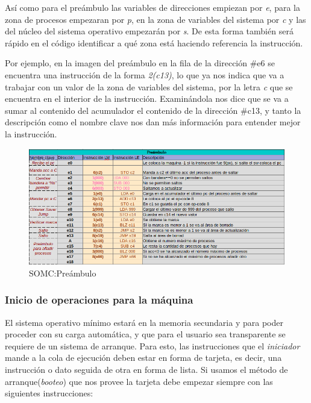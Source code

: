 \documentclass[letterpaper,12pt,oneside]{book}
\begin{document}
		Así como para el preámbulo las variables de direcciones empiezan por \textit{e}, para la zona de procesos empezaran por \textit{p},
		en la zona de variables del sistema por \textit{c} y las del núcleo del sistema operativo empezarán por \textit{s}. De esta forma
		también será rápido en el código identificar a qué zona está haciendo referencia la instrucción. 
  
        Por ejemplo, en la imagen
		del preámbulo en la fila de la dirección \#e6 se encuentra una instrucción de la forma \textit{2(c13)}, lo que ya nos indica
		que va a trabajar con un valor de la zona de variables del sistema, por la letra \textit{c} que se encuentra en el interior
		de la instrucción. Examinándola nos dice que se va a sumar al contenido del acumulador el contenido de la dirección \#c13, y tanto
		la descripción como el nombre clave nos dan más información para entender mejor la instrucción.
		
		\begin{figure}[h]		
			\centering
			\includegraphics[scale=0.45]{media/CARDIACC/Preambulo.png}
			\caption{SOMC:Preámbulo}
			\label{fig:somcPreambulo}
		\end{figure}
		
		\subsubsection{Inicio de operaciones para la máquina}
		
		El sistema operativo mínimo estará en la memoria secundaria y para poder proceder con su carga automática, y que para el usuario sea transparente se
		requiere de un sistema de arranque. Para esto, las instrucciones que el \textit{iniciador} mande a la cola de ejecución deben estar en forma de tarjeta, es decir, una instrucción o dato seguida de otra en forma de lista. Si usamos el método de arranque(\textit{booteo}) que nos provee \cite{fingerman_instruction_1968} la tarjeta 
		debe empezar siempre con las siguientes instrucciones:
\end{document}
